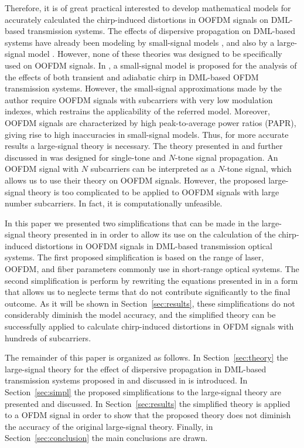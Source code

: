 \documentclass[journal]{IEEEtran}
\begin{document}
Therefore, it is of great practical interested to develop mathematical models for accurately calculated the chirp-induced distortions in OOFDM signals on DML-based transmission systems. The effects of dispersive propagation on DML-based systems have already been modeling by small-signal models \cite{smallsignal1, smallsignal2}, and also by a large-signal model \cite{eva,comments}. However, none of these theories was designed to be specifically used on OOFDM signals. In \cite{equalization}, a small-signal model is proposed for the analysis of the effects of both transient and adiabatic chirp in DML-based OFDM transmission systems. However, the small-signal approximations made by the author require OOFDM signals with subcarriers with very low modulation indexes, which restrains the applicability of the referred model. Moreover, OOFDM signals are characterized by high peak-to-average power ratios (PAPR), giving rise to high inaccuracies in small-signal models. Thus, for more accurate results a large-signal theory is necessary. The theory presented in \cite{eva} and further discussed in \cite{comments} was designed for single-tone and $N$-tone signal propagation. An OOFDM signal with $N$ subcarriers can be interpreted as a $N$-tone signal, which allows us to use their theory on OOFDM signals. However, the proposed large-signal theory is too complicated to be applied to OOFDM signals with large number subcarriers. In fact, it is computationally unfeasible. 

In this paper we presented two simplifications that can be made in the large-signal theory presented in \cite{eva} in order to allow its use on the calculation of the chirp-induced distortions in OOFDM signals in DML-based transmission optical systems. The first proposed simplification is based on the range of laser, OOFDM, and fiber parameters commonly use in short-range optical systems. The second simplification is perform by rewriting the equations presented in \cite{eva} in a form that allows us to neglecte terms that do not contribute significantly to the final outcome. As it will be shown in Section~\ref{sec:results}, these simplifications do not considerably diminish the model accuracy, and the simplified theory can be successfully applied to calculate chirp-induced distortions in OFDM signals with hundreds of subcarriers.

The remainder of this paper is organized as follows. In Section~\ref{sec:theory} the large-signal theory for the effect of dispersive propagation in DML-based transmission systems proposed in \cite{eva} and discussed in \cite{comments} is introduced. In Section~\ref{sec:simpl} the proposed simplifications to the large-signal theory are presented and discussed. In Section~\ref{sec:results} the simplified theory is applied to a OFDM signal in order to show that the proposed theory does not diminish the accuracy of the original large-signal theory. Finally, in Section~\ref{sec:conclusion} the main conclusions are drawn.
\end{document}

